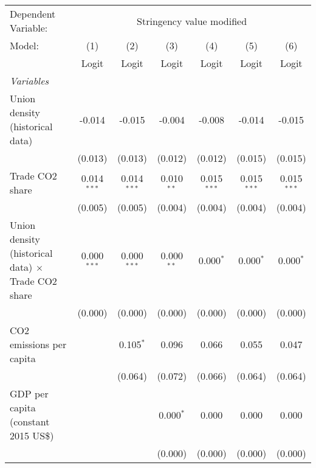 
\begingroup
\centering
\begin{tabular}{lcccccc}
   \toprule
   Dependent Variable: & \multicolumn{6}{c}{Stringency value modified}\\
   Model:                                                    & (1)           & (2)           & (3)          & (4)           & (5)           & (6)\\  
                                                             &  Logit        & Logit         & Logit        & Logit         & Logit         & Logit\\  
   \midrule
   \emph{Variables}\\
   Union density (historical data)                           & -0.014        & -0.015        & -0.004       & -0.008        & -0.014        & -0.015\\   
                                                             & (0.013)       & (0.013)       & (0.012)      & (0.012)       & (0.015)       & (0.015)\\   
   Trade CO2 share                                           & 0.014$^{***}$ & 0.014$^{***}$ & 0.010$^{**}$ & 0.015$^{***}$ & 0.015$^{***}$ & 0.015$^{***}$\\   
                                                             & (0.005)       & (0.005)       & (0.004)      & (0.004)       & (0.004)       & (0.004)\\   
   Union density (historical data) $\times$ Trade CO2 share  & 0.000$^{***}$ & 0.000$^{***}$ & 0.000$^{**}$ & 0.000$^{*}$   & 0.000$^{*}$   & 0.000$^{*}$\\   
                                                             & (0.000)       & (0.000)       & (0.000)      & (0.000)       & (0.000)       & (0.000)\\   
   CO2 emissions per capita                                  &               & 0.105$^{*}$   & 0.096        & 0.066         & 0.055         & 0.047\\   
                                                             &               & (0.064)       & (0.072)      & (0.066)       & (0.064)       & (0.064)\\   
   GDP per capita (constant 2015 US\$)                       &               &               & 0.000$^{*}$  & 0.000         & 0.000         & 0.000\\   
                                                             &               &               & (0.000)      & (0.000)       & (0.000)       & (0.000)\\   

\end{tabular}
